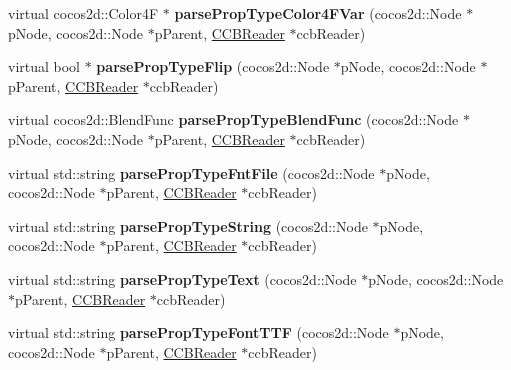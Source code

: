 \begin{DoxyCompactItemize}
virtual cocos2d\+::\+Color4F $\ast$ {\bfseries parse\+Prop\+Type\+Color4\+F\+Var} (cocos2d\+::\+Node $\ast$p\+Node, cocos2d\+::\+Node $\ast$p\+Parent, \hyperlink{classcocosbuilder_1_1CCBReader}{C\+C\+B\+Reader} $\ast$ccb\+Reader)
\item 
\mbox{\label{classcocosbuilder_1_1NodeLoader_aa996b7bd359d21adf5cac5e9f29c1e5c}} 
virtual bool $\ast$ {\bfseries parse\+Prop\+Type\+Flip} (cocos2d\+::\+Node $\ast$p\+Node, cocos2d\+::\+Node $\ast$p\+Parent, \hyperlink{classcocosbuilder_1_1CCBReader}{C\+C\+B\+Reader} $\ast$ccb\+Reader)
\item 
\mbox{\label{classcocosbuilder_1_1NodeLoader_a60dffeba0ae10937797e26acf851e0b6}} 
virtual cocos2d\+::\+Blend\+Func {\bfseries parse\+Prop\+Type\+Blend\+Func} (cocos2d\+::\+Node $\ast$p\+Node, cocos2d\+::\+Node $\ast$p\+Parent, \hyperlink{classcocosbuilder_1_1CCBReader}{C\+C\+B\+Reader} $\ast$ccb\+Reader)
\item 
\mbox{\label{classcocosbuilder_1_1NodeLoader_a71e470ac4c6e56136d57a68eaa49656b}} 
virtual std\+::string {\bfseries parse\+Prop\+Type\+Fnt\+File} (cocos2d\+::\+Node $\ast$p\+Node, cocos2d\+::\+Node $\ast$p\+Parent, \hyperlink{classcocosbuilder_1_1CCBReader}{C\+C\+B\+Reader} $\ast$ccb\+Reader)
\item 
\mbox{\label{classcocosbuilder_1_1NodeLoader_a368f598db681acbfce08213e022ad756}} 
virtual std\+::string {\bfseries parse\+Prop\+Type\+String} (cocos2d\+::\+Node $\ast$p\+Node, cocos2d\+::\+Node $\ast$p\+Parent, \hyperlink{classcocosbuilder_1_1CCBReader}{C\+C\+B\+Reader} $\ast$ccb\+Reader)
\item 
\mbox{\label{classcocosbuilder_1_1NodeLoader_aa9790841f228ac802752d447a471fabe}} 
virtual std\+::string {\bfseries parse\+Prop\+Type\+Text} (cocos2d\+::\+Node $\ast$p\+Node, cocos2d\+::\+Node $\ast$p\+Parent, \hyperlink{classcocosbuilder_1_1CCBReader}{C\+C\+B\+Reader} $\ast$ccb\+Reader)
\item 
\mbox{\label{classcocosbuilder_1_1NodeLoader_aeb384b6d66c5b015a888cb8640e39a34}} 
virtual std\+::string {\bfseries parse\+Prop\+Type\+Font\+T\+TF} (cocos2d\+::\+Node $\ast$p\+Node, cocos2d\+::\+Node $\ast$p\+Parent, \hyperlink{classcocosbuilder_1_1CCBReader}{C\+C\+B\+Reader} $\ast$ccb\+Reader)

\end{DoxyCompactItemize}
